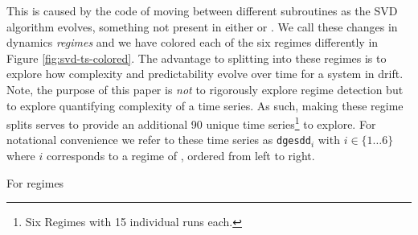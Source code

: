 This is caused by the code of \svd moving between different subroutines as the SVD algorithm evolves, something not present in either \gcc or \col. We call these changes in \svd dynamics \emph{\svd regimes} and we have colored each of the six regimes differently in Figure \ref{fig:svd-ts-colored}. The advantage to splitting \svd into these regimes is to explore how complexity and predictability evolve over time for a system in drift.  Note, the purpose of this paper is \emph{not} to rigorously explore regime detection but to explore quantifying complexity of a time series. As such, making these regime splits serves to provide an additional 90 unique time series\footnote{Six Regimes with 15 individual runs each.} to explore. For notational convenience we refer to these time series as {\tt dgesdd$_i$} with $i \in \{1\dots6\}$ where $i$ corresponds to a regime of \svd, ordered from left to right.


For regimes \cite{cao2004det}